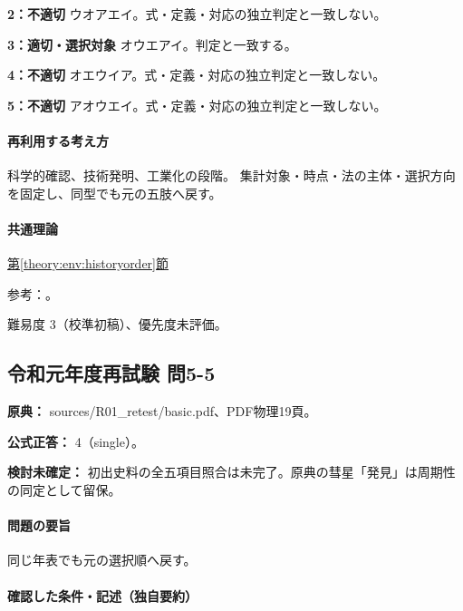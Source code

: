 \noindent\textbf{2：不適切} ウオアエイ。式・定義・対応の独立判定と一致しない。\par

\noindent\textbf{3：適切・選択対象} オウエアイ。判定と一致する。\par

\noindent\textbf{4：不適切} オエウイア。式・定義・対応の独立判定と一致しない。\par

\noindent\textbf{5：不適切} アオウエイ。式・定義・対応の独立判定と一致しない。\par

\paragraph{再利用する考え方} 科学的確認、技術発明、工業化の段階。 集計対象・時点・法の主体・選択方向を固定し、同型でも元の五肢へ戻す。

\paragraph{共通理論} \hyperref[theory:env:historyorder]{第\ref*{theory:env:historyorder}節}

\par 参考：\cite{env58_steam}。

\par 難易度 3（校準初稿）、優先度未評価。

\subsection{令和元年度再試験 問5-5}
\label{q:r01-ret-basic-5-5}

\noindent\textbf{原典：} sources/R01\_retest/basic.pdf、PDF物理19頁。

\textbf{公式正答：} 4（single）。

\par\textbf{検討未確定：} 初出史料の全五項目照合は未完了。原典の彗星「発見」は周期性の同定として留保。

\paragraph{問題の要旨} 同じ年表でも元の選択順へ戻す。

\paragraph{確認した条件・記述（独自要約）}\mbox{}\par

